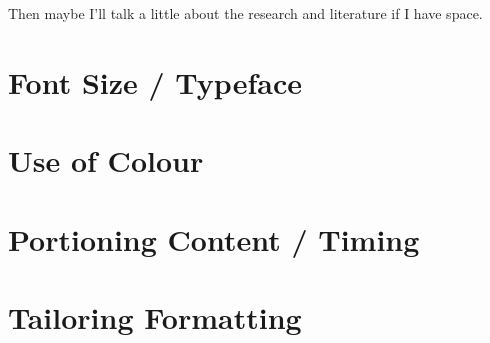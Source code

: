 \documentclass[12pt]{article}
\begin{document}
Then maybe I'll talk a little about the research and literature if I have space.

\section{Font Size / Typeface}

\section{Use of Colour}

\section{Portioning Content / Timing}

\section{Tailoring Formatting}
\end{document}
